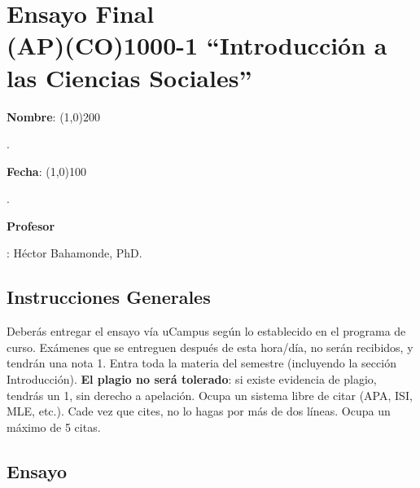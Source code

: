 \documentclass{article}
\begin{document}
%

{\centering\section*{Ensayo Final\\(AP)(CO)1000-1 ``Introducci\'on a las Ciencias Sociales''}}

{\vspace{.5cm}\raggedright{\bf Nombre}: \line(1,0){200}}. %
{\vspace{.5cm}\hspace{4.5cm}\raggedright{\bf Fecha}: \line(1,0){100}}. %


{\vspace{.5cm}\raggedright \bf Profesor}: H\'ector Bahamonde, PhD.\\


\vspace{0.5cm}\subsection*{Instrucciones Generales}

Deber\'as entregar el ensayo v\'ia uCampus seg\'un lo establecido en el programa de curso. Ex\'amenes que se entreguen despu\'es de esta hora/d\'ia, no ser\'an recibidos, y tendr\'an una nota 1. Entra toda la materia del semestre (incluyendo la secci\'on Introducci\'on). {\bf El plagio no ser\'a tolerado}: si existe evidencia de plagio, tendr\'as un 1, sin derecho a apelaci\'on. Ocupa un sistema libre de citar (APA, ISI, MLE, etc.). Cade vez que cites, no lo hagas por m\'as de dos l\'ineas. Ocupa un m\'aximo de 5 citas.


 

\subsection*{Ensayo}
\end{document}
